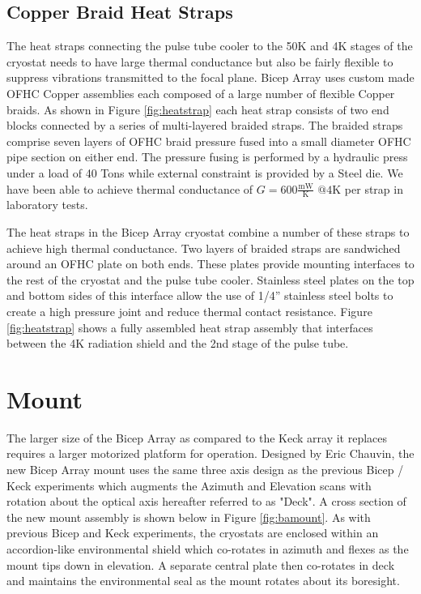 \documentclass[]{spie}  %
\begin{document}
\subsection{Copper Braid Heat Straps}

The heat straps connecting the pulse tube cooler to the 50K and 4K stages of
the cryostat needs to have large thermal conductance but also be fairly
flexible to suppress vibrations transmitted to the focal plane. Bicep Array
uses custom made OFHC Copper assemblies each composed of a large number of
flexible Copper braids. As shown in Figure \ref{fig:heatstrap} each heat strap
consists of two end blocks connected by a series of multi-layered braided
straps. The braided straps comprise seven layers of OFHC braid
pressure fused into a small diameter OFHC pipe section on either end. The
pressure fusing is performed by a hydraulic press under a load of 40 Tons
while external constraint is provided by a Steel die. We have been able to
achieve thermal conductance of $G=600 \frac{\text{mW}}{\text{K}}
\text{  @}4\text{K}$ per strap in laboratory tests. 

The heat straps in the Bicep Array cryostat combine a number of these straps
to achieve high thermal conductance. Two layers of braided straps are
sandwiched around an OFHC plate on both ends. These plates provide mounting
interfaces to the rest of the cryostat and the pulse tube cooler. Stainless
steel plates on the top and bottom sides of this interface allow the use of
1/4'' stainless steel bolts to create a high pressure joint and reduce thermal
contact resistance. Figure \ref{fig:heatstrap} shows a fully assembled heat
strap assembly that interfaces between the 4K radiation shield and the 2nd
stage of the pulse tube.




\section{Mount}

The larger size of the Bicep Array as compared to the Keck array it replaces
requires a larger motorized platform for operation. Designed by Eric Chauvin,
the new Bicep Array mount uses the same three axis design as the previous
Bicep / Keck experiments which augments the Azimuth and Elevation scans with
rotation about the optical axis hereafter referred to as "Deck". A cross section of the new mount assembly is shown below in Figure
\ref{fig:bamount}. As with previous Bicep and Keck experiments, the cryostats
are enclosed within an accordion-like environmental shield which co-rotates in
azimuth and flexes as the mount tips down in elevation. A separate central
plate then co-rotates in deck and maintains the environmental seal as the mount
rotates about its boresight. 
\end{document}
